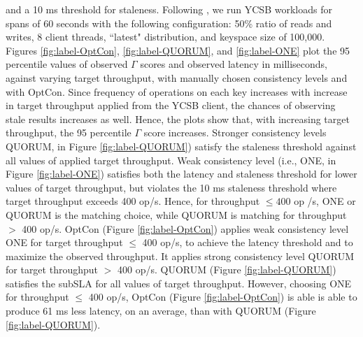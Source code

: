 \documentclass[conference]{IEEEtran}
\begin{document}
 and a 10 ms threshold for staleness.
 Following \cite{DBLP:conf/cloud/GolabRAKWG13}, we run YCSB workloads for spans of 60 seconds with the following configuration: 50\% ratio of reads and writes, 8 client threads,  ``latest" distribution, and keyspace size of 100,000.
Figures \ref{fig:label-OptCon}, \ref{fig:label-QUORUM}, and \ref{fig:label-ONE} plot the 95 percentile values of observed {\boldmath$\Gamma$} scores and observed latency in milliseconds, against varying target throughput, with manually chosen consistency levels and with OptCon.
Since frequency of operations on each key increases with increase in target throughput applied from the YCSB client, the chances of observing stale results increases as well. Hence, the plots show that, with increasing target throughput, the 95 percentile {\boldmath$\Gamma$} score increases.
 Stronger consistency levels QUORUM, in Figure \ref{fig:label-QUORUM}) satisfy the staleness threshold against all values of applied
 target throughput. %
 Weak consistency level (i.e., ONE, in Figure \ref{fig:label-ONE})
  satisfies both the latency and staleness threshold for lower values of target throughput, but violates the 10 ms staleness threshold where target throughput exceeds 400 op/s.
  Hence, for throughput $\le400$ op /s, ONE or QUORUM is the matching choice, while QUORUM is matching for throughput $>$ 400 op/s.
 OptCon (Figure \ref{fig:label-OptCon}) applies weak consistency level ONE for target throughput $\le$  400 op/s, to achieve the latency threshold and to maximize the observed throughput.
  It applies strong consistency level QUORUM %
 for target throughput $>$ 400 op/s. %
  QUORUM (Figure \ref{fig:label-QUORUM}) satisfies the subSLA for all values of target throughput. However, choosing ONE for throughput $\le$  400 op/s, OptCon (Figure \ref{fig:label-OptCon}) is able is able to produce 61 ms less latency, on an average, than with QUORUM  (Figure \ref{fig:label-QUORUM}).
\end{document}
